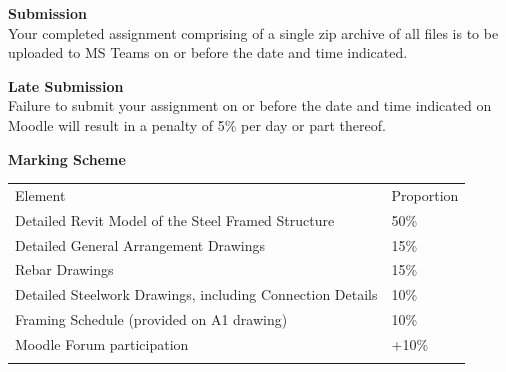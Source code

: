 \newpage


\textbf{Submission}\\
Your completed assignment comprising of a single zip archive of all files is to be uploaded to MS Teams on or before the date and time indicated.  

\vspace{0.5cm}

\textbf{Late Submission}\\
Failure to submit your assignment on or before the date and time indicated on Moodle will result in a penalty of 5\% per day or part thereof.

\vspace{0.5cm}
\textbf{Marking Scheme}

\begin{table}[h!]
     \begin{center}
     \begin{tabular}{p{9cm}  p{2cm} }
     \toprule
      \textbf\large{Element} & \textbf\large{Proportion} \\ 
    \cmidrule(r){1-1}\cmidrule(lr){2-2}
    	Detailed Revit Model of the Steel Framed Structure 		 	& 50\%\\
    	Detailed General Arrangement Drawings 						& 15\%\\
        Rebar Drawings 												& 15\%\\
        Detailed Steelwork Drawings, including Connection Details 	& 10\%\\
        Framing Schedule (provided on A1 drawing) 					& 10\%\\
        Moodle Forum participation				 					& +10\%\\    
      \\ \bottomrule
      \end{tabular}
      \label{tbl:markSchemeAsmt3}
      \end{center}
 \end{table}


